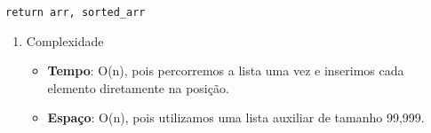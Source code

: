 \documentclass[11pt]{article}
\begin{document}
\begin{enumerate}
\begin{enumerate}
\begin{verbatim}
return arr, sorted_arr
\end{verbatim}
\begin{enumerate}
\item Complexidade
\label{sec:org36df2ee}
\begin{itemize}
\item \textbf{Tempo}: O(n), pois percorremos a lista uma vez e inserimos cada elemento diretamente na posição.
\item \textbf{Espaço}: O(n), pois utilizamos uma lista auxiliar de tamanho 99,999.
\end{itemize}
\end{enumerate}
\end{enumerate}
\end{enumerate}
\end{document}
